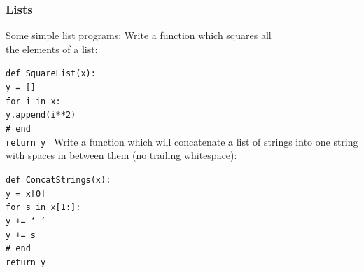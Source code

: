 \documentclass{beamer}
\newcommand{\code}[1]{\texttt{#1}}
\newcommand{\tab}{\hspace*{22pt}}
\begin{document}
\begin{frame}%
	\frametitle{Lists}
	
	\begin{block}{Some simple list programs:}
			Write a function which squares all \\ the elements of a list:
			
			\vspace{10pt}
			\code{def SquareList(x): \\
			\tab y = [] \\
			\tab for i in x: \\
			\tab \tab y.append(i**2) \\
			\tab \# end \\
			\tab return y
			}
		\endminipage\hfill
			Write a function which will concatenate a list of strings into one string with spaces in between them (no trailing whitespace):
			
			\vspace{10pt}
			\code{def ConcatStrings(x): \\
			\tab y = x[0] \\
			\tab for s in x[1:]: \\
			\tab \tab y += ` ' \\
			\tab \tab y += s \\
			\tab \# end \\
			\tab return y
			}
		\endminipage\hfill
	\end{block}
	
\end{frame}
\end{document}
